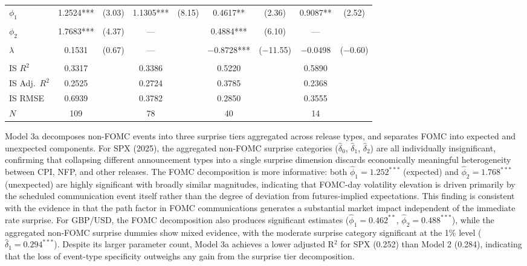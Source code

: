\documentclass[12pt,a4paper]{report}
\begin{document}
\begin{table}[H]
{\begin{tabular}{lcccccccc}
$\phi_1$       & 1.2524*** & (3.03) & 1.1305*** & (8.15) & 0.4617** & (2.36) & 0.9087** & (2.52) \\
               & & & & & & & & \\
$\phi_2$       & 1.7683*** & (4.37) & --- & & 0.4884*** & (6.10) & --- & \\
               & & & & & & & & \\
$\lambda$      & 0.1531 & (0.67) & --- & & $-$0.8728*** & ($-$11.55) & $-$0.0498 & ($-$0.60) \\
               & & & & & & & & \\
\midrule
IS $R^2$       & 0.3317 & & 0.3386 & & 0.5220 & & 0.5890 & \\
IS Adj.\ $R^2$ & 0.2525 & & 0.2724 & & 0.3785 & & 0.2368 & \\
IS RMSE        & 0.6939 & & 0.3782 & & 0.2850 & & 0.3555 & \\
$N$            & 109 & & 78 & & 40 & & 14 & \\
\bottomrule
\end{tabular}
}
\end{table}

Model 3a decomposes non-FOMC events into three surprise tiers aggregated across release types, and separates FOMC into expected and unexpected components. For SPX (2025), the aggregated non-FOMC surprise categories ($\hat{\delta}_0$, $\hat{\delta}_1$, $\hat{\delta}_2$) are all individually insignificant, confirming that collapsing different announcement types into a single surprise dimension discards economically meaningful heterogeneity between CPI, NFP, and other releases. The FOMC decomposition is more informative: both $\hat{\phi}_1 = 1.252^{***}$ (expected) and $\hat{\phi}_2 = 1.768^{***}$ (unexpected) are highly significant with broadly similar magnitudes, indicating that FOMC-day volatility elevation is driven primarily by the scheduled communication event itself rather than the degree of deviation from futures-implied expectations. This finding is consistent with the evidence in \citet{Gurkaynak2005} that the path factor in FOMC communications generates a substantial market impact independent of the immediate rate surprise. For GBP/USD, the FOMC decomposition also produces significant estimates ($\hat{\phi}_1 = 0.462^{**}$, $\hat{\phi}_2 = 0.488^{***}$), while the aggregated non-FOMC surprise dummies show mixed evidence, with the moderate surprise category significant at the 1\% level ($\hat{\delta}_1 = 0.294^{***}$). Despite its larger parameter count, Model 3a achieves a lower adjusted R$^2$ for SPX (0.252) than Model 2 (0.284), indicating that the loss of event-type specificity outweighs any gain from the surprise tier decomposition.
\end{document}
